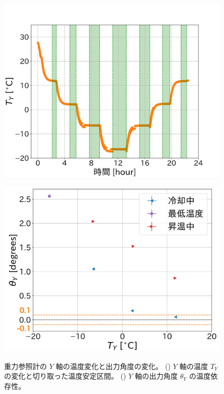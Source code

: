 \documentclass[../../main.tex]{subfiles}
\begin{document}
\begin{figure}[H]
    \begin{minipage}[b]{0.45\columnwidth}
        \centering
        \includegraphics[width=1.1\columnwidth]{tiltsensor/bath_tempY.png}
        \subcaption{}
        \label{fig:bath_tempY}
    \end{minipage}
    \hspace{0.005\columnwidth}
    \begin{minipage}[b]{0.45\columnwidth}
        \centering
        \includegraphics[width=1.03\columnwidth]{tiltsensor/angleY_temp_dep.pdf}
        \subcaption{}
        \label{fig:angleY_temp_dep}
    \end{minipage}
    \caption{重力参照計の $Y$ 軸の温度変化と出力角度の変化。
             () $Y$ 軸の温度 $T_{Y}$ の変化と切り取った温度安定区間。
             () $Y$ 軸の出力角度 $\theta_{Y}$ の温度依存性。}
    \label{fig:evaluation_bath_Yaxis}
\end{figure}
\end{document}

